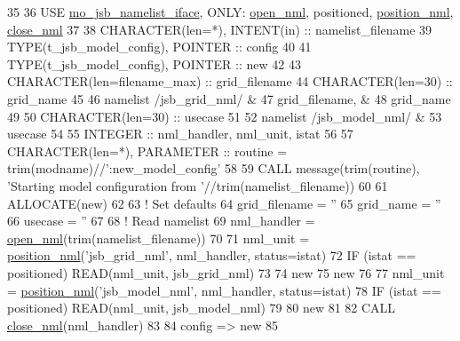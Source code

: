 \begin{DoxyCode}
35 
36     \textcolor{keywordtype}{USE }\hyperlink{namespacemo__jsb__namelist__iface}{mo\_jsb\_namelist\_iface}\textcolor{keywordtype}{, ONLY}: \hyperlink{namespacemo__jsb__namelist__iface_abb2821ffd4c30375faa307d522af3bcb}{open\_nml}, positioned, 
      \hyperlink{namespacemo__jsb__namelist__iface_a4d29dc192b429a0c5f11ecd7d7f637e9}{position\_nml}, \hyperlink{namespacemo__jsb__namelist__iface_a240047c255ab5bb3871ecdcdcd6d6a92}{close\_nml}
37 
38     \textcolor{keywordtype}{CHARACTER(len=*)}, \textcolor{keywordtype}{INTENT(in)} :: namelist\_filename
39     \textcolor{keywordtype}{TYPE}(t\_jsb\_model\_config), \textcolor{keywordtype}{POINTER} :: config
40 
41     \textcolor{keywordtype}{TYPE}(t\_jsb\_model\_config), \textcolor{keywordtype}{POINTER} :: new
42 
43     \textcolor{keywordtype}{CHARACTER(len=filename\_max)} :: grid\_filename
44     \textcolor{keywordtype}{CHARACTER(len=30)}           :: grid\_name
45 
46     namelist /jsb\_grid\_nml/   &
47       grid\_filename,          &
48       grid\_name
49 
50     \textcolor{keywordtype}{CHARACTER(len=30)}           :: usecase
51 
52     namelist /jsb\_model\_nml/  &
53       usecase
54 
55     \textcolor{keywordtype}{INTEGER} :: nml\_handler, nml\_unit, istat
56 
57     \textcolor{keywordtype}{CHARACTER(len=*)}, \textcolor{keywordtype}{PARAMETER} :: routine = trim(modname)//\textcolor{stringliteral}{':new\_model\_config'}
58 
59     \textcolor{keyword}{CALL }message(trim(routine), \textcolor{stringliteral}{'Starting model configuration from '}//trim(namelist\_filename))
60 
61     \textcolor{keyword}{ALLOCATE}(new)
62 
63     \textcolor{comment}{! Set defaults}
64     grid\_filename = \textcolor{stringliteral}{''}
65     grid\_name     = \textcolor{stringliteral}{''}
66     usecase       = \textcolor{stringliteral}{''}
67 
68     \textcolor{comment}{! Read namelist}
69     nml\_handler = \hyperlink{namespacemo__jsb__namelist__iface_abb2821ffd4c30375faa307d522af3bcb}{open\_nml}(trim(namelist\_filename))
70 
71     nml\_unit = \hyperlink{namespacemo__jsb__namelist__iface_a4d29dc192b429a0c5f11ecd7d7f637e9}{position\_nml}(\textcolor{stringliteral}{'jsb\_grid\_nml'}, nml\_handler, status=istat)
72     \textcolor{keywordflow}{IF} (istat == positioned) \textcolor{keyword}{READ}(nml\_unit, jsb\_grid\_nml)
73 
74     new%
75     new%
76 
77     nml\_unit =  \hyperlink{namespacemo__jsb__namelist__iface_a4d29dc192b429a0c5f11ecd7d7f637e9}{position\_nml}(\textcolor{stringliteral}{'jsb\_model\_nml'}, nml\_handler, status=istat)
78     \textcolor{keywordflow}{IF} (istat == positioned) \textcolor{keyword}{READ}(nml\_unit, jsb\_model\_nml)
79 
80     new%
81 
82     \textcolor{keyword}{CALL }\hyperlink{namespacemo__jsb__namelist__iface_a240047c255ab5bb3871ecdcdcd6d6a92}{close\_nml}(nml\_handler)
83 
84     config => new
85 
\end{DoxyCode}


